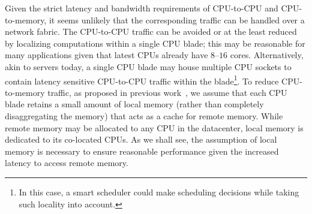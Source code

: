 Given the strict latency and bandwidth requirements of CPU-to-CPU and CPU-to-memory, it seems unlikely that the corresponding traffic can be handled over a network fabric. The CPU-to-CPU traffic can be avoided or at the least reduced by localizing computations within a single CPU blade; this may be reasonable for many applications given that latest CPUs already have $8$--$16$ cores. Alternatively, akin to servers today, a single CPU blade may house multiple CPU sockets to contain latency sensitive CPU-to-CPU traffic within the blade{\footnote{In this case, a smart scheduler could make scheduling decisions while taking such locality into account.}}. To reduce CPU-to-memory traffic, as proposed in previous work~\cite{mem1}, we assume that each CPU blade retains a small amount of local memory (rather than completely disaggregating the memory) that acts as a cache for remote memory. While remote memory may be allocated to any CPU in the datacenter, local memory is dedicated to its co-located CPUs. As we shall see, the assumption of local memory is necessary to ensure reasonable performance given the increased latency to access remote memory.

